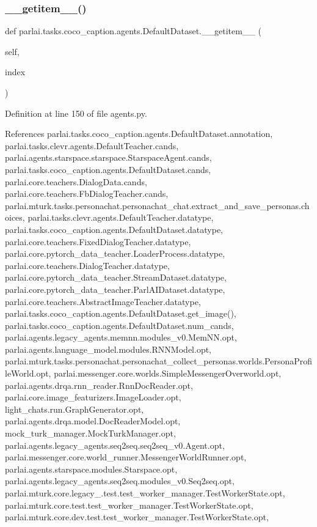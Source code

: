 \subsubsection{\texorpdfstring{\+\_\+\+\_\+getitem\+\_\+\+\_\+()}{\_\_getitem\_\_()}}
{\footnotesize\ttfamily def parlai.\+tasks.\+coco\+\_\+caption.\+agents.\+Default\+Dataset.\+\_\+\+\_\+getitem\+\_\+\+\_\+ (\begin{DoxyParamCaption}\item[{}]{self,  }\item[{}]{index }\end{DoxyParamCaption})}



Definition at line 150 of file agents.\+py.



References parlai.\+tasks.\+coco\+\_\+caption.\+agents.\+Default\+Dataset.\+annotation, parlai.\+tasks.\+clevr.\+agents.\+Default\+Teacher.\+cands, parlai.\+agents.\+starspace.\+starspace.\+Starspace\+Agent.\+cands, parlai.\+tasks.\+coco\+\_\+caption.\+agents.\+Default\+Dataset.\+cands, parlai.\+core.\+teachers.\+Dialog\+Data.\+cands, parlai.\+core.\+teachers.\+Fb\+Dialog\+Teacher.\+cands, parlai.\+mturk.\+tasks.\+personachat.\+personachat\+\_\+chat.\+extract\+\_\+and\+\_\+save\+\_\+personas.\+choices, parlai.\+tasks.\+clevr.\+agents.\+Default\+Teacher.\+datatype, parlai.\+tasks.\+coco\+\_\+caption.\+agents.\+Default\+Dataset.\+datatype, parlai.\+core.\+teachers.\+Fixed\+Dialog\+Teacher.\+datatype, parlai.\+core.\+pytorch\+\_\+data\+\_\+teacher.\+Loader\+Process.\+datatype, parlai.\+core.\+teachers.\+Dialog\+Teacher.\+datatype, parlai.\+core.\+pytorch\+\_\+data\+\_\+teacher.\+Stream\+Dataset.\+datatype, parlai.\+core.\+pytorch\+\_\+data\+\_\+teacher.\+Parl\+A\+I\+Dataset.\+datatype, parlai.\+core.\+teachers.\+Abstract\+Image\+Teacher.\+datatype, parlai.\+tasks.\+coco\+\_\+caption.\+agents.\+Default\+Dataset.\+get\+\_\+image(), parlai.\+tasks.\+coco\+\_\+caption.\+agents.\+Default\+Dataset.\+num\+\_\+cands, parlai.\+agents.\+legacy\+\_\+agents.\+memnn.\+modules\+\_\+v0.\+Mem\+N\+N.\+opt, parlai.\+agents.\+language\+\_\+model.\+modules.\+R\+N\+N\+Model.\+opt, parlai.\+mturk.\+tasks.\+personachat.\+personachat\+\_\+collect\+\_\+personas.\+worlds.\+Persona\+Profile\+World.\+opt, parlai.\+messenger.\+core.\+worlds.\+Simple\+Messenger\+Overworld.\+opt, parlai.\+agents.\+drqa.\+rnn\+\_\+reader.\+Rnn\+Doc\+Reader.\+opt, parlai.\+core.\+image\+\_\+featurizers.\+Image\+Loader.\+opt, light\+\_\+chats.\+run.\+Graph\+Generator.\+opt, parlai.\+agents.\+drqa.\+model.\+Doc\+Reader\+Model.\+opt, mock\+\_\+turk\+\_\+manager.\+Mock\+Turk\+Manager.\+opt, parlai.\+agents.\+legacy\+\_\+agents.\+seq2seq.\+seq2seq\+\_\+v0.\+Agent.\+opt, parlai.\+messenger.\+core.\+world\+\_\+runner.\+Messenger\+World\+Runner.\+opt, parlai.\+agents.\+starspace.\+modules.\+Starspace.\+opt, parlai.\+agents.\+legacy\+\_\+agents.\+seq2seq.\+modules\+\_\+v0.\+Seq2seq.\+opt, parlai.\+mturk.\+core.\+legacy\+\_.\+test.\+test\+\_\+worker\+\_\+manager.\+Test\+Worker\+State.\+opt, parlai.\+mturk.\+core.\+test.\+test\+\_\+worker\+\_\+manager.\+Test\+Worker\+State.\+opt, parlai.\+mturk.\+core.\+dev.\+test.\+test\+\_\+worker\+\_\+manager.\+Test\+Worker\+State.\+opt, 